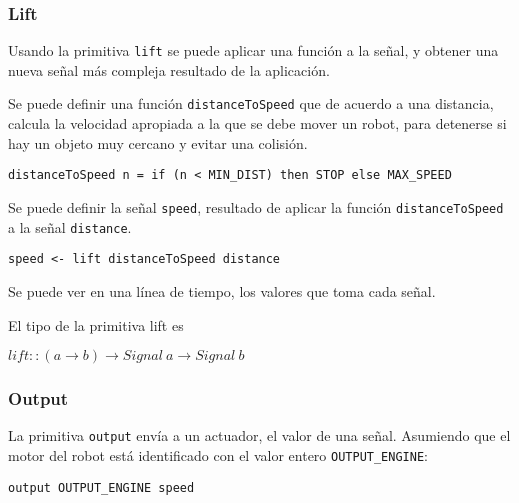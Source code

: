 \subsubsection{Lift}
  Usando la primitiva \texttt{lift} se puede aplicar una función
a la señal, y obtener una nueva señal más compleja resultado de la
aplicación.

  Se puede definir una función \texttt{distanceToSpeed} que de acuerdo
a una distancia, calcula la velocidad apropiada a la que se debe mover
un robot, para detenerse si hay un objeto muy cercano y evitar una colisión.

\begin{center}
\begin{Verbatim}[frame=single]
distanceToSpeed n = if (n < MIN_DIST) then STOP else MAX_SPEED
\end{Verbatim}
\end{center}


  Se puede definir la señal \texttt{speed}, resultado de aplicar la
función \texttt{distanceToSpeed} a la señal \texttt{distance}.

\begin{center}
\begin{Verbatim}[frame=single]
speed <- lift distanceToSpeed distance
\end{Verbatim}
\end{center}

Se puede ver en una línea de tiempo, los valores que toma
cada señal.


El tipo de la primitiva lift es

\begin{center}
  $lift :: (a \rightarrow b) \rightarrow Signal\ a \rightarrow Signal\ b$
\end{center}

\subsubsection{Output}
  La primitiva \texttt{output} envía a un actuador, el valor de una señal.
  Asumiendo que el motor del robot está identificado con el valor entero
\texttt{OUTPUT\_ENGINE}:

\begin{center}
\begin{Verbatim}[frame=single]
output OUTPUT_ENGINE speed
\end{Verbatim}
\end{center}

